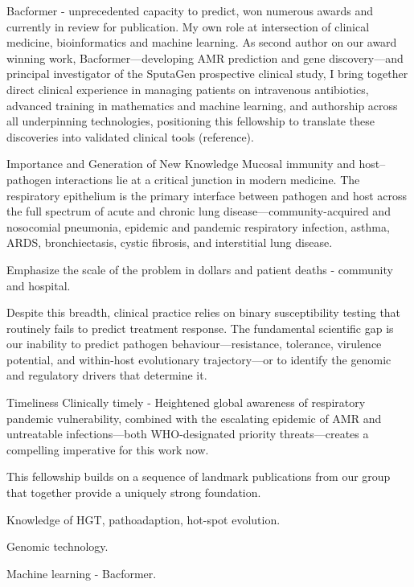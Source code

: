 Bacformer - unprecedented capacity to predict, won numerous awards and currently in review for publication.  My own role at intersection of clinical medicine, bioinformatics and machine learning. As second author on our award winning work, Bacformer—developing AMR prediction and gene discovery—and principal investigator of the SputaGen prospective clinical study, I bring together direct clinical experience in managing patients on intravenous antibiotics, advanced training in mathematics and machine learning, and authorship across all underpinning technologies, positioning this fellowship to translate these discoveries into validated clinical tools (reference).

Importance and Generation of New Knowledge
Mucosal immunity and host–pathogen interactions lie at a critical junction in modern medicine. The respiratory epithelium is the primary interface between pathogen and host across the full spectrum of acute and chronic lung disease—community-acquired and nosocomial pneumonia, epidemic and pandemic respiratory infection, asthma, ARDS, bronchiectasis, cystic fibrosis, and interstitial lung disease. 

Emphasize the scale of the problem in dollars and patient deaths - community and hospital. 

Despite this breadth, clinical practice relies on binary susceptibility testing that routinely fails to predict treatment response. The fundamental scientific gap is our inability to predict pathogen behaviour—resistance, tolerance, virulence potential, and within-host evolutionary trajectory—or to identify the genomic and regulatory drivers that determine it. 

Timeliness
Clinically timely - Heightened global awareness of respiratory pandemic vulnerability, combined with the escalating epidemic of AMR and untreatable infections—both WHO-designated priority threats—creates a compelling imperative for this work now. 

This fellowship builds on a sequence of landmark publications from our group that together provide a uniquely strong foundation.

Knowledge of HGT, pathoadaption, hot-spot evolution. 

Genomic technology.

Machine learning - Bacformer.  

